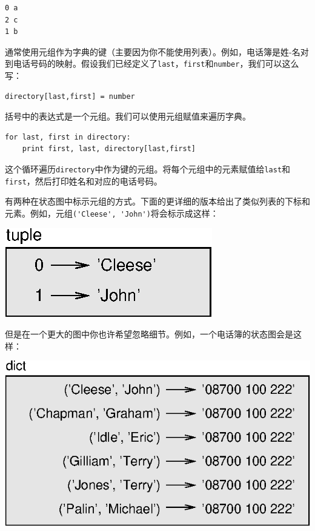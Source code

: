 \beforeverb
\begin{verbatim}
0 a
2 c
1 b
\end{verbatim}
\afterverb
%


通常使用元组作为字典的键（主要因为你不能使用列表）。例如，电话簿是姓-名对到电话号码的映射。假设我们已经定义了{\tt last}，{\tt first}和{\tt number}，我们可以这么写：

\beforeverb
\begin{verbatim}
directory[last,first] = number
\end{verbatim}
\afterverb
%
括号中的表达式是一个元组。我们可以使用元组赋值来遍历字典。


\beforeverb
\begin{verbatim}
for last, first in directory:
    print first, last, directory[last,first]
\end{verbatim}
\afterverb
%
这个循环遍历{\tt directory}中作为键的元组。将每个元组中的元素赋值给{\tt last}和{\tt first}，然后打印姓名和对应的电话号码。

有两种在状态图中标示元组的方式。下面的更详细的版本给出了类似列表的下标和元素。例如，元组\verb"('Cleese', 'John')"将会标示成这样：


\beforefig
\centerline{\includegraphics{figs/tuple1.eps}}
\afterfig
但是在一个更大的图中你也许希望忽略细节。例如，一个电话簿的状态图会是这样：

\beforefig
\centerline{\includegraphics{figs/dict2.eps}}
\afterfig

